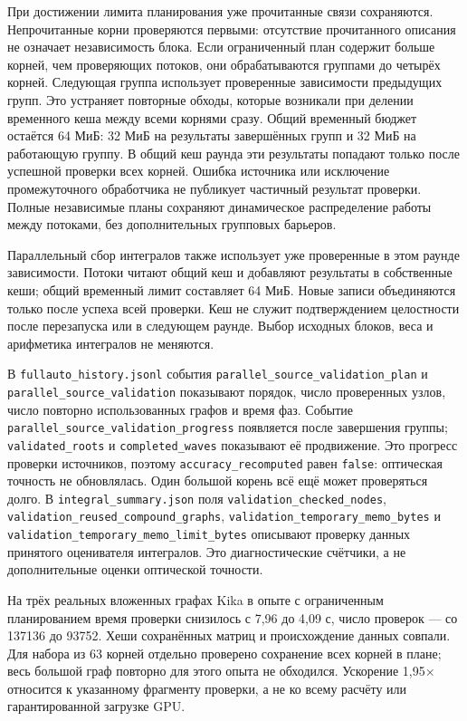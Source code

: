 При достижении лимита планирования уже прочитанные связи сохраняются.
Непрочитанные корни проверяются первыми: отсутствие прочитанного
описания не означает независимость блока. Если ограниченный план
содержит больше корней, чем проверяющих потоков, они обрабатываются
группами до четырёх корней. Следующая группа использует проверенные
зависимости предыдущих групп. Это устраняет повторные обходы, которые
возникали при делении временного кеша между всеми корнями сразу. Общий
временный бюджет остаётся 64 МиБ: 32 МиБ на результаты завершённых групп
и 32 МиБ на работающую группу. В общий кеш раунда эти результаты
попадают только после успешной проверки всех корней. Ошибка источника
или исключение промежуточного обработчика не публикует частичный
результат проверки. Полные независимые планы сохраняют динамическое
распределение работы между потоками, без дополнительных групповых
барьеров.

Параллельный сбор интегралов также использует уже проверенные в этом
раунде зависимости. Потоки читают общий кеш и добавляют результаты в
собственные кеши; общий временный лимит составляет 64 МиБ. Новые записи
объединяются только после успеха всей проверки. Кеш не служит
подтверждением целостности после перезапуска или в следующем раунде.
Выбор исходных блоков, веса и арифметика интегралов не меняются.

В \nolinkurl{fullauto_history.jsonl} события
\nolinkurl{parallel_source_validation_plan} и
\nolinkurl{parallel_source_validation} показывают порядок, число
проверенных узлов, число повторно использованных графов и время фаз.
Событие \nolinkurl{parallel_source_validation_progress} появляется после
завершения группы; \nolinkurl{validated_roots} и \nolinkurl{completed_waves}
показывают её продвижение. Это прогресс проверки источников, поэтому
\nolinkurl{accuracy_recomputed} равен \texttt{false}: оптическая точность
не обновлялась. Один большой корень всё ещё может проверяться долго. В
\nolinkurl{integral_summary.json} поля
\nolinkurl{validation_checked_nodes},
\nolinkurl{validation_reused_compound_graphs},
\nolinkurl{validation_temporary_memo_bytes} и
\nolinkurl{validation_temporary_memo_limit_bytes} описывают проверку
данных принятого оценивателя интегралов. Это диагностические счётчики, а
не дополнительные оценки оптической точности.

На трёх реальных вложенных графах Kika в опыте с ограниченным
планированием время проверки снизилось с 7,96 до 4,09 с, число проверок
--- со 137136 до 93752. Хеши сохранённых матриц и происхождение данных
совпали. Для набора из 63 корней отдельно проверено сохранение всех
корней в плане; весь большой граф повторно для этого опыта не обходился.
Ускорение 1,95× относится к указанному фрагменту проверки, а не ко всему
расчёту или гарантированной загрузке GPU.


